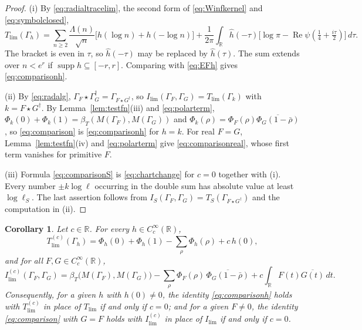 \documentclass[11pt]{amsart}
\newtheorem{corollary}[theorem]{Corollary}
\theoremstyle{remark}
\numberwithin{equation}{section}
\newcommand{\R}{\mathbb R}
\newcommand{\Rel}{\operatorname{Re}}
\newcommand{\supp}{\operatorname{supp}}
\newcommand{\Tl}{T_{\lim}}
\newcommand{\Il}{I_{\lim}}
\begin{document}
\begin{proof}
(i) By \eqref{eq:radialtracelim}, the second form of \eqref{eq:Winfkernel}
and \eqref{eq:symbolclosed},
\[
  \Tl(\Gamma_h)=\sum_{n\ge2}\frac{\Lambda(n)}{\sqrt n}
     \bigl[h(\log n)+h(-\log n)\bigr]
   +\frac1{2\pi}\int_\R\hat h(-\tau)
     \bigl[\log\pi-\Rel\psi(\tfrac14+\tfrac{i\tau}2)\bigr]\,d\tau .
\]
The bracket is even in $\tau$, so $\hat h(-\tau)$ may be replaced by
$\hat h(\tau)$.  The sum extends over $n<e^{r}$ if $\supp h\subseteq[-r,r]$.
Comparing with \eqref{eq:EFh} gives
\eqref{eq:comparisonh}.

(ii) By \eqref{eq:radalg},
$\Gamma_F\star\Gamma_G^\dagger=\Gamma_{F\star G^\dagger}$, so
$\Il(\Gamma_F,\Gamma_G)=\Tl(\Gamma_k)$ with $k=F\star G^\dagger$.  By
Lemma~\ref{lem:testfn}(iii) and \eqref{eq:polarterm},
$\Phi_k(0)+\Phi_k(1)=\beta_T(M(\Gamma_F),M(\Gamma_G))$ and
$\Phi_k(\rho)=\Phi_F(\rho)\overline{\Phi_G(1-\bar\rho)}$, so
\eqref{eq:comparison} is \eqref{eq:comparisonh} for $h=k$.  For real $F=G$,
Lemma~\ref{lem:testfn}(iv) and \eqref{eq:polarterm} give
\eqref{eq:comparisonreal}, whose first term vanishes for primitive $F$.

(iii) Formula \eqref{eq:comparisonS} is \eqref{eq:chartchange} for $c=0$
together with (i).  Every number $\pm k\log\ell$ occurring in the double sum
has absolute value at least $\log\ell_S$.  The last assertion follows from
$I_S(\Gamma_F,\Gamma_G)=T_S(\Gamma_{F\star G^\dagger})$ and the computation
in (ii).
\end{proof}

\begin{corollary}
\label{cor:c-unique}
Let $c\in\R$.  For every $h\in C_c^\infty(\R)$,
\begin{equation}
\label{eq:comparisonhc}
  T^{(c)}_{\lim}(\Gamma_h)=\Phi_h(0)+\Phi_h(1)-\sum_\rho\Phi_h(\rho)+c\,h(0),
\end{equation}
and for all $F,G\in C_c^\infty(\R)$,
\begin{equation}
\label{eq:comparisonc}
  I^{(c)}_{\lim}(\Gamma_F,\Gamma_G)
   =\beta_T\bigl(M(\Gamma_F),M(\Gamma_G)\bigr)
   -\sum_\rho\Phi_F(\rho)\,\overline{\Phi_G(1-\bar\rho)}
   +c\int_\R F(t)\overline{G(t)}\,dt .
\end{equation}
Consequently, for a given $h$ with $h(0)\ne0$, the identity
\eqref{eq:comparisonh} holds with $T^{(c)}_{\lim}$ in place of $\Tl$ if and
only if $c=0$; and for a given $F\ne0$, the identity \eqref{eq:comparison}
with $G=F$ holds with $I^{(c)}_{\lim}$ in place of $\Il$ if and only if
$c=0$.
\end{corollary}
\end{document}
